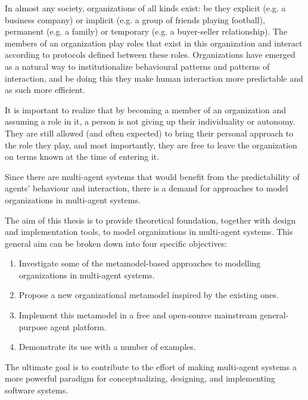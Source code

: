 In almost any society, organizations of all kinds exist: be they explicit (e.g. a business company) or implicit (e.g. a group of friends playing football), permanent (e.g. a family) or temporary (e.g. a buyer-seller relationship).
The members of an organization play roles that exist in this organization and interact according to protocols defined between these roles.
Organizations have emerged as a natural way to institutionalize behavioural patterns and patterns of interaction, and be doing this they make human interaction more predictable and as such more efficient.

It is important to realize that by becoming a member of an organization and assuming a role in it, a person is not giving up their individuality or autonomy.
They are still allowed (and often expected) to bring their personal approach to the role they play, and most importantly, they are free to leave the organization on terms known at the time of entering it.

Since there are multi-agent systems that would benefit from the predictability of agents' behaviour and interaction, there is a demand for approaches to model organizations in multi-agent systems.


The aim of this thesis is to provide theoretical foundation, together with design and implementation tools, to model organizations in multi-agent systems.
This general aim can be broken down into four specific objectives:
\begin{enumerate}
	\item Investigate some of the metamodel-based approaches to modelling organizations in multi-agent systems.
	\item Propose a new organizational metamodel inspired by the existing ones.
	\item Implement this metamodel in a free and open-source mainstream general-purpose agent platform.
	\item Demonstrate its use with a number of examples. 
\end{enumerate}
The ultimate goal is to contribute to the effort of making multi-agent systems a more powerful paradigm for conceptualizing, designing, and implementing software systems.


